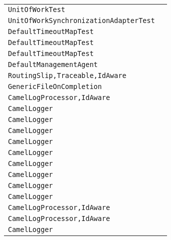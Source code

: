 \begin{center}
\begin{tabular}{ll}
\lstinline/UnitOfWorkTest/&\raisebox{0pt}{\lstinline/process(Exchange)/}\\
\lstinline/UnitOfWorkSynchronizationAdapterTest/&\raisebox{0pt}{\lstinline/process(Exchange)/}\\
\lstinline/DefaultTimeoutMapTest/&\raisebox{0pt}{\lstinline/testDefaultTimeoutMapPurge()/}\\
\lstinline/DefaultTimeoutMapTest/&\raisebox{0pt}{\lstinline/testDefaultTimeoutMapStopStart()/}\\
\lstinline/DefaultTimeoutMapTest/&\raisebox{0pt}{\lstinline/testExecutor()/}\\
\lstinline/DefaultManagementAgent/&\raisebox{0pt}{\lstinline/doStop()/}\\
\lstinline/RoutingSlip,Traceable,IdAware/&\raisebox{0pt}{\lstinline/EndpointresolveEndpoint(RoutingSlipIterator,Exchange)/}\\
\lstinline/GenericFileOnCompletion/&\raisebox{0pt}{\lstinline/processStrategyRollback()/}\\
\lstinline/CamelLogProcessor,IdAware/&\raisebox{0pt}{\lstinline/process(Exchange,String)/}\\
\lstinline/CamelLogger/&\raisebox{0pt}{\lstinline/process(Exchange,String)/}\\
\lstinline/CamelLogger/&\raisebox{0pt}{\lstinline/process(Exchange,Throwable)/}\\
\lstinline/CamelLogger/&\raisebox{0pt}{\lstinline/booleanprocess(Exchange,AsyncCallback)/}\\
\lstinline/CamelLogger/&\raisebox{0pt}{\lstinline/process(Exchange,String)/}\\
\lstinline/CamelLogger/&\raisebox{0pt}{\lstinline/process(Exchange,Throwable)/}\\
\lstinline/CamelLogger/&\raisebox{0pt}{\lstinline/booleanprocess(Exchange,AsyncCallback)/}\\
\lstinline/CamelLogger/&\raisebox{0pt}{\lstinline/process(Exchange,String)/}\\
\lstinline/CamelLogger/&\raisebox{0pt}{\lstinline/process(Exchange,Throwable)/}\\
\lstinline/CamelLogger/&\raisebox{0pt}{\lstinline/booleanprocess(Exchange,AsyncCallback)/}\\
\lstinline/CamelLogProcessor,IdAware/&\raisebox{0pt}{\lstinline/process(Exchange,Throwable)/}\\
\lstinline/CamelLogProcessor,IdAware/&\raisebox{0pt}{\lstinline/booleanprocess(Exchange,AsyncCallback)/}\\
\lstinline/CamelLogger/&\raisebox{0pt}{\lstinline/log(String,Throwable)/}\\

\end{tabular}
\end{center}
